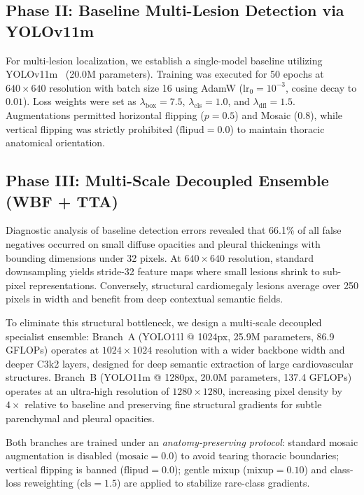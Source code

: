 \documentclass[10pt,twocolumn,letterpaper]{article}
\begin{document}
\subsection{Phase II: Baseline Multi-Lesion Detection via YOLOv11m}
For multi-lesion localization, we establish a single-model baseline utilizing YOLOv11m~\cite{jocher2024yolo11} (20.0M parameters). Training was executed for 50 epochs at $640 \times 640$ resolution with batch size 16 using AdamW ($\text{lr}_0 = 10^{-3}$, cosine decay to $0.01$). Loss weights were set as $\lambda_{\text{box}} = 7.5$, $\lambda_{\text{cls}} = 1.0$, and $\lambda_{\text{dfl}} = 1.5$. Augmentations permitted horizontal flipping ($p=0.5$) and Mosaic ($0.8$), while vertical flipping was strictly prohibited ($\text{flipud} = 0.0$) to maintain thoracic anatomical orientation.

\subsection{Phase III: Multi-Scale Decoupled Ensemble (WBF + TTA)}
Diagnostic analysis of baseline detection errors revealed that 66.1\% of all false negatives occurred on small diffuse opacities and pleural thickenings with bounding dimensions under 32 pixels. At $640 \times 640$ resolution, standard downsampling yields stride-32 feature maps where small lesions shrink to sub-pixel representations. Conversely, structural cardiomegaly lesions average over 250 pixels in width and benefit from deep contextual semantic fields.

To eliminate this structural bottleneck, we design a multi-scale decoupled specialist ensemble:
Branch~A (YOLO11l @ 1024px, 25.9M parameters, 86.9 GFLOPs) operates at $1024 \times 1024$ resolution with a wider backbone width and deeper C3k2 layers, designed for deep semantic extraction of large cardiovascular structures.
Branch~B (YOLO11m @ 1280px, 20.0M parameters, 137.4 GFLOPs) operates at an ultra-high resolution of $1280 \times 1280$, increasing pixel density by $4\times$ relative to baseline and preserving fine structural gradients for subtle parenchymal and pleural opacities.

Both branches are trained under an \textit{anatomy-preserving protocol}: standard mosaic augmentation is disabled ($\text{mosaic}=0.0$) to avoid tearing thoracic boundaries; vertical flipping is banned ($\text{flipud}=0.0$); gentle mixup ($\text{mixup}=0.10$) and class-loss reweighting ($\text{cls}=1.5$) are applied to stabilize rare-class gradients.
\end{document}
